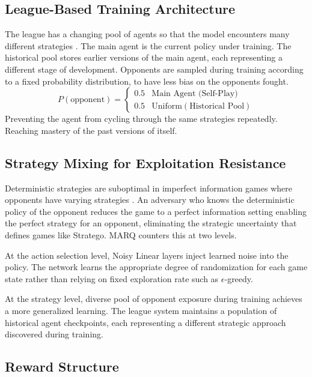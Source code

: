 \subsection{League-Based Training Architecture}
The league has a changing pool of agents so that the model encounters many different strategies \cite{perolat2022stratego}. The main agent is the current policy under training. The historical pool stores earlier versions of the main agent, each representing a different stage of development. Opponents are sampled during training according to a fixed probability distribution, to have less bias on the opponents fought.
\begin{equation}
P(\text{opponent}) = 
\begin{cases} 
0.5 & \text{Main Agent (Self-Play)} \\
0.5 & \text{Uniform}(\text{Historical Pool})
\end{cases}
\end{equation}
Preventing the agent from cycling through the same strategies repeatedly. Reaching mastery of the past versions of itself.

\subsection{Strategy Mixing for Exploitation Resistance}

Deterministic strategies are suboptimal in imperfect information games where opponents have varying strategies \cite{perolat2022stratego, MARLGametheoretic}. An adversary who knows the deterministic policy of the opponent reduces the game to a perfect information setting enabling the perfect strategy for an opponent, eliminating the strategic uncertainty that defines games like Stratego. MARQ counters this at two levels.

At the action selection level, Noisy Linear layers inject learned noise into the policy. The network learns the appropriate degree of randomization for each game state rather than relying on fixed exploration rate such as $\epsilon$-greedy.

At the strategy level, diverse pool of opponent exposure during training achieves a more generalized learning. The league system maintains a population of historical agent checkpoints, each representing a different strategic approach discovered during training. 

\subsection{Reward Structure}


